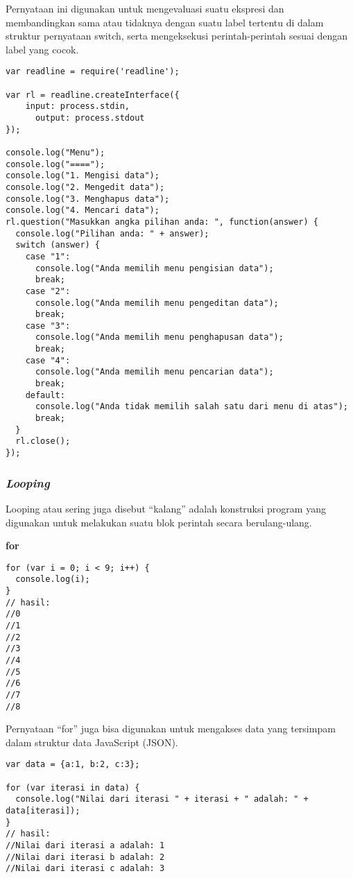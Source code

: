 Pernyataan ini digunakan untuk mengevaluasi suatu ekspresi dan membandingkan sama atau tidaknya dengan suatu label tertentu di dalam struktur pernyataan switch, serta mengeksekusi perintah-perintah sesuai dengan label yang cocok.

\begin{lstlisting}
var readline = require('readline');

var rl = readline.createInterface({
    input: process.stdin,
      output: process.stdout
});

console.log("Menu");
console.log("====");
console.log("1. Mengisi data");
console.log("2. Mengedit data");
console.log("3. Menghapus data");
console.log("4. Mencari data");
rl.question("Masukkan angka pilihan anda: ", function(answer) {
  console.log("Pilihan anda: " + answer);
  switch (answer) {
    case "1":
      console.log("Anda memilih menu pengisian data");
      break;
    case "2":
      console.log("Anda memilih menu pengeditan data");
      break;
    case "3":
      console.log("Anda memilih menu penghapusan data");
      break;
    case "4":
      console.log("Anda memilih menu pencarian data");
      break;
    default:
      console.log("Anda tidak memilih salah satu dari menu di atas");
      break;
  }
  rl.close();
});
\end{lstlisting}


\subsubsection{\textit{Looping}}

Looping atau sering juga disebut ``kalang'' adalah konstruksi program yang digunakan untuk melakukan suatu blok perintah secara berulang-ulang.

\textbf{for}

\begin{lstlisting}
for (var i = 0; i < 9; i++) {
  console.log(i);
}
// hasil:
//0
//1
//2
//3
//4
//5
//6
//7
//8
\end{lstlisting}

Pernyataan ``for'' juga bisa digunakan untuk mengakses data yang tersimpam dalam struktur data JavaScript (JSON).

\begin{lstlisting}
var data = {a:1, b:2, c:3};

for (var iterasi in data) {
  console.log("Nilai dari iterasi " + iterasi + " adalah: " + data[iterasi]);
}
// hasil:
//Nilai dari iterasi a adalah: 1
//Nilai dari iterasi b adalah: 2
//Nilai dari iterasi c adalah: 3
\end{lstlisting}

